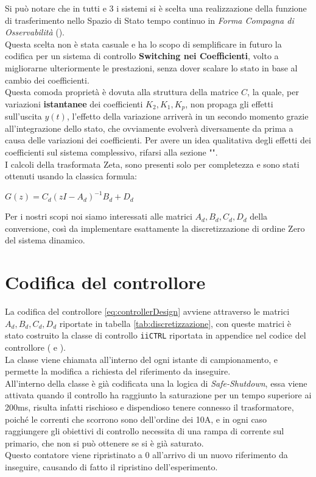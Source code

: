 \noindent
Si può notare che in tutti e 3 i sistemi si è scelta una realizzazione della funzione di trasferimento nello Spazio di Stato tempo continuo in \textit{Forma Compagna di Osservabilità} (\cite{FormeCanoniche}).\\
Questa scelta non è stata casuale e ha lo scopo di semplificare in futuro la codifica per un sistema di controllo \textbf{Switching nei Coefficienti}, volto a migliorarne ulteriormente le prestazioni, senza dover scalare lo stato in base al cambio dei coefficienti.\\
Questa comoda proprietà è dovuta alla struttura della matrice $ C $, la quale, per variazioni \textbf{istantanee} dei coefficienti $ K_2,K_1,K_p$, non propaga gli effetti sull'uscita $ y(t) $, l'effetto della variazione arriverà in un secondo momento grazie all'integrazione dello stato, che ovviamente evolverà diversamente da prima a causa delle variazioni dei coefficienti. Per avere un idea qualitativa degli effetti dei coefficienti sul sistema complessivo, rifarsi alla sezione "".\\
I calcoli della trasformata Zeta, sono presenti solo per completezza e sono stati ottenuti usando la classica formula:\vspace{-5mm}
\begin{center}
{\Large 		$ G(z) = C_d \left(z I - A_d\right)^{-1} B_d + D_d $}
\end{center}
\noindent
Per i nostri scopi noi siamo interessati alle matrici $ A_d,B_d,C_d,D_d $ della conversione, così da implementare esattamente la discretizzazione di ordine Zero del sistema dinamico.\\
\vspace{-6mm}
\section{Codifica del controllore}\vspace{-4mm}
La codifica del controllore \ref{eq:controllerDesign} avviene attraverso le matrici $ A_d,B_d,C_d,D_d $ riportate in tabella \ref{tab:discretizzazione}, con queste matrici è stato costruito la classe di controllo \verb|iiCTRL| riportata in appendice nel codice del controllore ( e ).\\
La classe viene chiamata all'interno del  ogni istante di campionamento, e permette la modifica a richiesta del riferimento da inseguire.\\
All'interno della classe è già codificata una la logica di \textit{Safe-Shutdown}, essa viene attivata quando il controllo ha raggiunto la saturazione per un tempo superiore ai 200ms, risulta infatti rischioso e dispendioso tenere connesso il trasformatore, poiché le correnti che scorrono sono dell'ordine dei 10A, e in ogni caso raggiungere gli obiettivi di controllo necessita di una rampa di corrente sul primario, che non si può ottenere se si è già saturato.\\
Questo contatore viene ripristinato a 0 all'arrivo di un nuovo riferimento da inseguire, causando di fatto il ripristino dell'esperimento.

